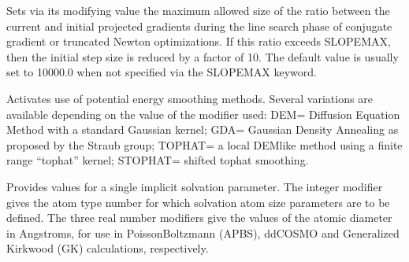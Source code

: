 \documentclass[letterpaper,11pt,english]{sphinxmanual}
\begin{document}
\ignorespaces {}\label{\detokenize{text/keywords:key-slopemax}}\begin{description}
\sphinxAtStartPar
Sets via its modifying value the maximum allowed size of the ratio between the current and initial projected gradients during the line search phase of conjugate gradient or truncated Newton optimizations. If this ratio exceeds SLOPEMAX, then the initial step size is reduced by a factor of 10. The default value is usually set to 10000.0 when not specified via the SLOPEMAX keyword.

\end{description}

\ignorespaces {}\label{\detokenize{text/keywords:key-smoothing}}\begin{description}
\sphinxAtStartPar
Activates use of potential energy smoothing methods. Several variations are available depending on the value of the modifier used: DEM= Diffusion Equation Method with a standard Gaussian kernel; GDA= Gaussian Density Annealing as proposed by the Straub group; TOPHAT= a local DEM\sphinxhyphen{}like method using a finite range “tophat” kernel; STOPHAT= shifted tophat smoothing.

\end{description}

\ignorespaces {}\label{\detokenize{text/keywords:key-solute}}\begin{description}
\sphinxAtStartPar
Provides values for a single implicit solvation parameter. The integer modifier gives the atom type number for which solvation atom size parameters are to be defined. The three real number modifiers give the values of the atomic diameter in Angstroms, for use in Poisson\sphinxhyphen{}Boltzmann (APBS), ddCOSMO and Generalized Kirkwood (GK) calculations, respectively.

\end{description}
\end{document}
